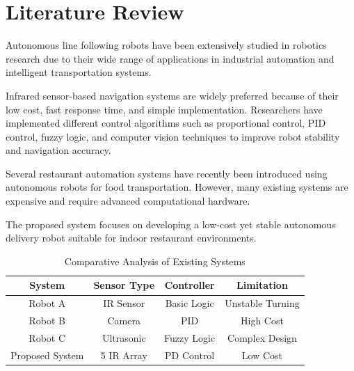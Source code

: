 \documentclass[12pt,a4paper,oneside]{report}
\begin{document}

\chapter{Literature Review}

Autonomous line following robots have been extensively studied in robotics research due to their wide range of applications in industrial automation and intelligent transportation systems.

Infrared sensor-based navigation systems are widely preferred because of their low cost, fast response time, and simple implementation. Researchers have implemented different control algorithms such as proportional control, PID control, fuzzy logic, and computer vision techniques to improve robot stability and navigation accuracy.

Several restaurant automation systems have recently been introduced using autonomous robots for food transportation. However, many existing systems are expensive and require advanced computational hardware.

The proposed system focuses on developing a low-cost yet stable autonomous delivery robot suitable for indoor restaurant environments.


\begin{table}[H]
\centering
\caption{Comparative Analysis of Existing Systems}
\begin{tabular}{|c|c|c|c|}
\hline
System & Sensor Type & Controller & Limitation \\
\hline
Robot A & IR Sensor & Basic Logic & Unstable Turning \\
Robot B & Camera & PID & High Cost \\
Robot C & Ultrasonic & Fuzzy Logic & Complex Design \\
Proposed System & 5 IR Array & PD Control & Low Cost \\
\hline
\end{tabular}
\end{table}

\end{document}
